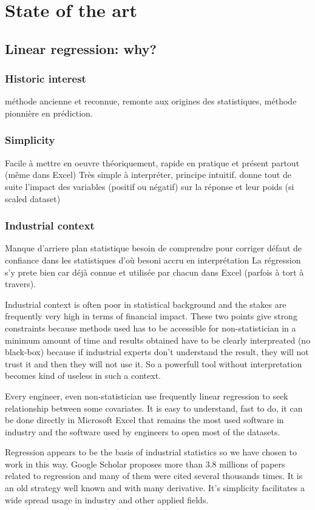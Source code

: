 \documentclass[12pt,a4paper]{report}
\begin{document}
\chapter{State of the art}
	\section{Linear regression: why?}
		\subsection{Historic interest}
			méthode ancienne et reconnue, remonte aux origines des statistiques, méthode pionnière en prédiction.
		\subsection{Simplicity}
			Facile à mettre en oeuvre théoriquement, rapide en pratique et présent partout (même dans Excel)
			Très simple à interpréter, principe intuitif.
			donne tout de suite l'impact des variables (positif ou négatif) sur la réponse et leur poids (si scaled dataset) 
		\subsection{Industrial context}
			Manque d'arriere plan statistique
			besoin de comprendre pour corriger
			défaut de confiance dans les statistiques d'où besoni accru en interprétation
			La régression s'y prete bien car déjà connue et utilisée par chacun dans Excel (parfois à tort à travers).
			
			
			Industrial context is often poor in statistical background and the stakes are frequently very high in terms of financial impact. 
		These two points give strong constraints because methods used has to be accessible for non-statistician in a minimum amount of time and results obtained have to be clearly interpreated (no black-box) because if industrial experts don't understand the result, they will not trust it and then they will not use it. So a powerfull tool without interpretation becomes kind of useless in such a context.
		
		Every engineer, even non-statistician use frequently linear regression to seek relationship between some covariates. It is easy to understand, fast to do, it can be done directly in Microsoft Excel that remains the most used software in industry and the software used by engineers to open most of the datasets.
		 
		 Regression appears to be the basis of industrial statistics so we have chosen to work in this way. Google Scholar proposes more than $3.8$ millions of papers related to regression and many of them were cited several thousands times. It is an old strategy well known and with many derivative. 
		 It's simplicity facilitates a wide spread usage in industry and other applied fields.
			
\end{document}
